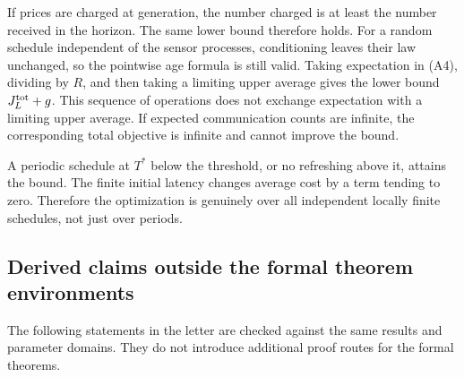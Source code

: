 \documentclass[11pt,letterpaper]{article}
\begin{document}
If prices are charged at generation, the number charged is at least the number received in the horizon. The same lower bound therefore holds. For a random schedule independent of the sensor processes, conditioning leaves their law unchanged, so the pointwise age formula is still valid. Taking expectation in (A4), dividing by $R$, and then taking a limiting upper average gives the lower bound $J_L^{\rm tot}+g$. This sequence of operations does not exchange expectation with a limiting upper average. If expected communication counts are infinite, the corresponding total objective is infinite and cannot improve the bound.

A periodic schedule at $T^*$ below the threshold, or no refreshing above it, attains the bound. The finite initial latency changes average cost by a term tending to zero. Therefore the optimization is genuinely over all independent locally finite schedules, not just over periods.

\subsection{Derived claims outside the formal theorem environments}
The following statements in the letter are checked against the same results and parameter domains. They do not introduce additional proof routes for the formal theorems.
\end{document}
